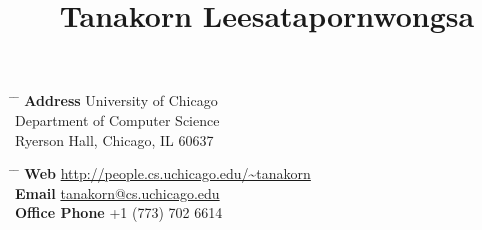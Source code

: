 \documentclass[10pt]{article} %
\begin{document}

\title{Tanakorn Leesatapornwongsa} %


\parbox{0.4\textwidth}{ %
\begin{tabbing} %
\hspace{1.5cm} \= \hspace{2cm} \= \kill %
{\bf Address} \> University of Chicago\\ %
\> Department of Computer Science \\ %
\> Ryerson Hall, Chicago, IL 60637 \\ %
\end{tabbing}}
\hfill %
\parbox{0.6\textwidth}{ %
\begin{tabbing} %
\hspace{2.3cm} \= \hspace{2cm} \= \kill %
{\bf Web} \> \href{http://people.cs.uchicago.edu/\~tanakorn}{http://people.cs.uchicago.edu/\textasciitilde tanakorn} \\ %
{\bf Email} \> \href{mailto:tanakorn@cs.uchicago.edu}{tanakorn@cs.uchicago.edu} \\ %
{\bf Office Phone} \> +1 (773) 702 6614 \\ %
\end{tabbing}}



\end{document}
